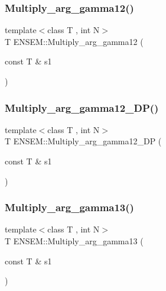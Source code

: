 \mbox{\label{namespaceENSEM_ad87f605b2c52a2e2163988dd6a162c6c}} 
\subsubsection{\texorpdfstring{Multiply\_arg\_gamma12()}{Multiply\_arg\_gamma12()}}
{\footnotesize\ttfamily template$<$class T , int N$>$ \\
T E\+N\+S\+E\+M\+::\+Multiply\+\_\+arg\+\_\+gamma12 (\begin{DoxyParamCaption}\item[{const T \&}]{s1 }\end{DoxyParamCaption})\hspace{0.3cm}{\ttfamily [inline]}}

\mbox{\label{namespaceENSEM_adb0071f13d0d62199ef3077b2f9d1c41}} 
\subsubsection{\texorpdfstring{Multiply\_arg\_gamma12\_DP()}{Multiply\_arg\_gamma12\_DP()}}
{\footnotesize\ttfamily template$<$class T , int N$>$ \\
T E\+N\+S\+E\+M\+::\+Multiply\+\_\+arg\+\_\+gamma12\+\_\+\+DP (\begin{DoxyParamCaption}\item[{const T \&}]{s1 }\end{DoxyParamCaption})\hspace{0.3cm}{\ttfamily [inline]}}

\mbox{\label{namespaceENSEM_a896031e37c4b82dc0dbce775f3a13202}} 
\subsubsection{\texorpdfstring{Multiply\_arg\_gamma13()}{Multiply\_arg\_gamma13()}}
{\footnotesize\ttfamily template$<$class T , int N$>$ \\
T E\+N\+S\+E\+M\+::\+Multiply\+\_\+arg\+\_\+gamma13 (\begin{DoxyParamCaption}\item[{const T \&}]{s1 }\end{DoxyParamCaption})\hspace{0.3cm}{\ttfamily [inline]}}


